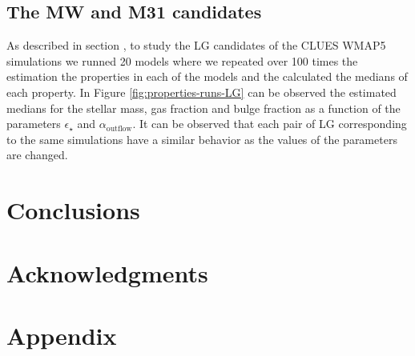 \documentclass[usenatbib]{mn2e}
\begin{document}
\subsection{The MW and M31 candidates}
As described in section \label{sec:modeling-lg}, to study the LG candidates of the CLUES WMAP5 simulations we runned 20 models where we repeated over 100 times 
the estimation the properties in each of the models and the calculated the medians of each property. In Figure \ref{fig:properties-runs-LG} can be observed
the estimated medians for the stellar mass, gas fraction and bulge fraction as a function of the parameters $\epsilon_{\star}$ and $\alpha_{\text{outflow}}$.
It can be observed that each pair of LG corresponding to the same simulations have a similar behavior as the values of the parameters are changed.

\section{Conclusions}
\label{sec:conclusions}

\section*{Acknowledgments}  


 





\section{Appendix}
\label{sec:appendix}
\end{document}
